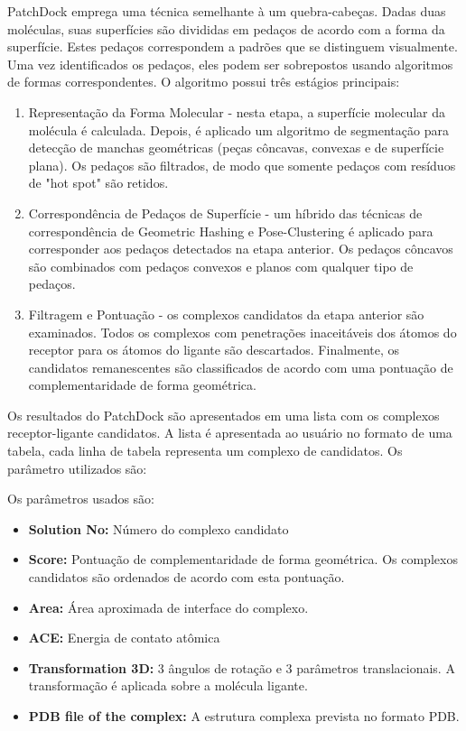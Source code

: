 \documentclass[11pt, letterpaper, portuguese]{article}
\begin{document}
\par{PatchDock emprega uma técnica semelhante à um quebra-cabeças. Dadas duas moléculas, suas superfícies são divididas em pedaços de acordo com a forma da superfície. Estes pedaços correspondem a padrões que se distinguem visualmente. Uma vez identificados os pedaços, eles podem ser sobrepostos usando algoritmos de formas correspondentes. O algoritmo possui três estágios principais:}

\begin{enumerate}
    \item Representação da Forma Molecular - nesta etapa, a superfície molecular da molécula é calculada. Depois, é aplicado um algoritmo de segmentação para detecção de manchas geométricas (peças côncavas, convexas e de superfície plana). Os pedaços são filtrados, de modo que somente pedaços com resíduos de "hot spot" são retidos.
    \item Correspondência de Pedaços de Superfície - um híbrido das técnicas de correspondência de Geometric Hashing e Pose-Clustering é aplicado para corresponder aos pedaços detectados na etapa anterior. Os pedaços côncavos são combinados com pedaços convexos e planos com qualquer tipo de pedaços.
    \item Filtragem e Pontuação - os complexos candidatos da etapa anterior são examinados. Todos os complexos com penetrações inaceitáveis dos átomos do receptor para os átomos do ligante são descartados. Finalmente, os candidatos remanescentes são classificados de acordo com uma pontuação de complementaridade de forma geométrica.

\end{enumerate}

\par{Os resultados do PatchDock são apresentados em uma lista com os complexos receptor-ligante candidatos. A lista é apresentada ao usuário no formato de uma tabela, cada linha de tabela representa um complexo de candidatos. Os parâmetro utilizados são:}

\par{Os parâmetros usados são:}
\begin{itemize}
    \item\textbf{ Solution No:} Número do complexo candidato

    \item \textbf{Score:} Pontuação de complementaridade de forma geométrica. Os complexos candidatos são ordenados de acordo com esta pontuação.

    \item \textbf{Area:} Área aproximada de interface do complexo.

    \item\textbf{ACE:} Energia de contato atômica

    \item \textbf{Transformation 3D:} 3 ângulos de rotação e 3 parâmetros translacionais. A transformação é aplicada sobre a molécula ligante.

    \item \textbf{PDB file of the complex:} A estrutura complexa prevista no formato PDB.

\end{itemize}
\end{document}
